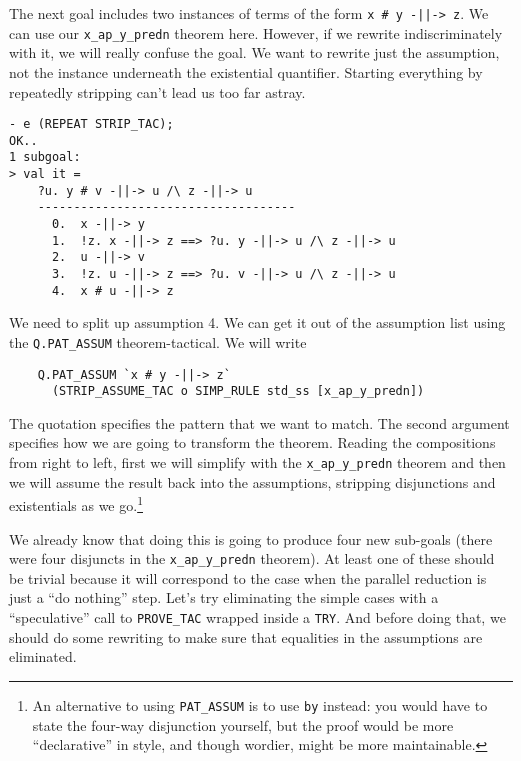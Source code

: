     The next goal includes two instances of terms of the form
    \verb!x # y -||-> z!.  We can use our \verb!x_ap_y_predn!
    theorem here.  However, if we rewrite indiscriminately with it, we
    will really confuse the goal.  We want to rewrite just the
    assumption, not the instance underneath the existential
    quantifier.  Starting everything by repeatedly stripping can't
    lead us too far astray.
\begin{session}\begin{verbatim}
- e (REPEAT STRIP_TAC);
OK..
1 subgoal:
> val it =
    ?u. y # v -||-> u /\ z -||-> u
    ------------------------------------
      0.  x -||-> y
      1.  !z. x -||-> z ==> ?u. y -||-> u /\ z -||-> u
      2.  u -||-> v
      3.  !z. u -||-> z ==> ?u. v -||-> u /\ z -||-> u
      4.  x # u -||-> z
\end{verbatim}\end{session}
We need to split up assumption 4.  We can get it out of the assumption
list using the \texttt{Q.PAT\_ASSUM} theorem-tactical.  We will write
\begin{verbatim}
    Q.PAT_ASSUM `x # y -||-> z`
      (STRIP_ASSUME_TAC o SIMP_RULE std_ss [x_ap_y_predn])
\end{verbatim}
The quotation specifies the pattern that we want to match.  The second
argument specifies how we are going to transform the theorem.  Reading
the compositions from right to left, first we will simplify with the
\verb!x_ap_y_predn! theorem and then we will assume the result back
into the assumptions, stripping disjunctions and existentials as we
go.\footnote{An alternative to using \texttt{PAT\_ASSUM} is to use
  \texttt{by} instead: you would have to state the four-way
  disjunction yourself, but the proof would be more ``declarative'' in
  style, and though wordier, might be more maintainable.}

We already know that doing this is going to produce four new sub-goals
(there were four disjuncts in the \verb!x_ap_y_predn! theorem).  At
least one of these should be trivial because it will correspond to the
case when the parallel reduction is just a ``do nothing'' step.  Let's
try eliminating the simple cases with a ``speculative'' call to
\texttt{PROVE\_TAC} wrapped inside a \texttt{TRY}.  And before doing
that, we should do some rewriting to make sure that equalities in the
assumptions are eliminated.

